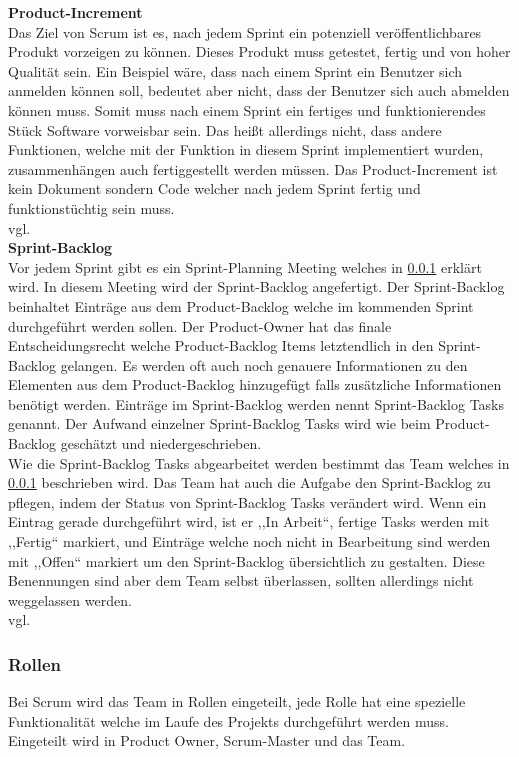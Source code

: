 			\textbf{Product-Increment} \\
			Das Ziel von Scrum ist es, nach jedem Sprint ein potenziell veröffentlichbares Produkt vorzeigen zu können. Dieses Produkt muss getestet, fertig und von hoher Qualität sein. Ein Beispiel wäre, dass nach einem Sprint ein Benutzer sich anmelden können soll, bedeutet aber nicht, dass der Benutzer sich auch abmelden können muss. Somit muss nach einem Sprint ein fertiges und funktionierendes Stück Software vorweisbar sein. Das heißt allerdings nicht, dass andere Funktionen, welche mit der Funktion in diesem Sprint implementiert wurden, zusammenhängen auch fertiggestellt werden müssen. Das Product-Increment ist kein Dokument sondern Code welcher nach jedem Sprint fertig und funktionstüchtig sein muss.\\ vgl. \textcite{ScrumProduct-Increment}\\

			\textbf{Sprint-Backlog} \\ 
			Vor jedem Sprint gibt es ein Sprint-Planning Meeting welches in \ref{sec:Rollen} erklärt wird. In diesem Meeting wird der Sprint-Backlog angefertigt. Der Sprint-Backlog beinhaltet Einträge aus dem Product-Backlog welche im kommenden Sprint durchgeführt werden sollen. Der Product-Owner hat das finale Entscheidungsrecht welche Product-Backlog Items letztendlich in den Sprint-Backlog gelangen. Es werden oft auch noch genauere Informationen zu den Elementen aus dem Product-Backlog hinzugefügt falls zusätzliche Informationen benötigt werden.
			Einträge im Sprint-Backlog werden nennt Sprint-Backlog Tasks genannt. Der Aufwand einzelner Sprint-Backlog Tasks wird wie beim Product-Backlog geschätzt und niedergeschrieben.\\
			Wie die Sprint-Backlog Tasks abgearbeitet werden bestimmt das Team welches in \ref{sec:Rollen} beschrieben wird. Das Team hat auch die Aufgabe den Sprint-Backlog zu pflegen, indem der Status von Sprint-Backlog Tasks verändert wird. Wenn ein Eintrag gerade durchgeführt wird, ist er ,,In Arbeit``, fertige Tasks werden mit ,,Fertig`` markiert, und Einträge welche noch nicht in Bearbeitung sind werden mit ,,Offen`` markiert um den Sprint-Backlog übersichtlich zu gestalten. Diese Benennungen sind aber dem Team selbst überlassen, sollten allerdings nicht weggelassen werden.\\ vgl. \textcite{ScrumSprint-Backlog} \\ 
	\subsubsection{Rollen}
	\label{sec:Rollen}
		Bei Scrum wird das Team in Rollen eingeteilt, jede Rolle hat eine spezielle Funktionalität welche im Laufe des Projekts durchgeführt werden muss. Eingeteilt wird in Product Owner, Scrum-Master und das Team. \\

